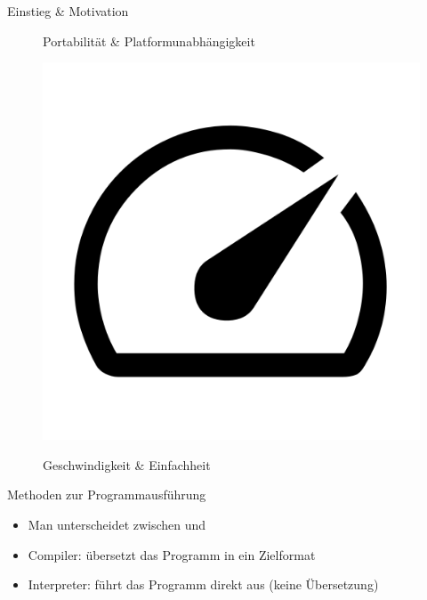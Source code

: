 \begin{frame}{Einstieg \& Motivation}
\begin{figure}[h]
\begin{minipage}{.32\textwidth}
\begin{center}
                {\small Portabilität \& Platformunabhängigkeit}
			\end{center}
		\end{minipage}
		\hfill
		\begin{minipage}{.32\textwidth}
			\begin{center}
				\centerline{\includegraphics[width=.5\textwidth]{assets/google_icon_speed.png}}
				{\small Geschwindigkeit \& Einfachheit }
			\end{center}
		\end{minipage}
		\begin{center}
		\end{center}
	\end{figure}
\end{frame}

\begin{frame}{Methoden zur Programmausführung}
	\begin{itemize}
		\item Man unterscheidet zwischen  und 
		\item Compiler: übersetzt das Programm in ein Zielformat
        \item Interpreter: führt das Programm direkt aus (keine Übersetzung)
	\end{itemize}
\end{frame}

